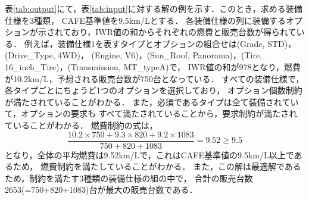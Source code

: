 

表\ref{tab:output}にて，表\ref{tab:input}に対する解の例を示す．このとき，求める装備仕様を3種類，
CAFE基準値を9.5km/Lとする．
各装備仕様の列に装備するオプションが示されており，IWR値の和からそれぞれの燃費と販売台数が得られている．
例えば，装備仕様1を表すタイプとオプションの組合せは(Grade, STD)，(Drive\_Type, 4WD)，
(Engine, V6)，(Sun\_Roof, Panorama)，(Tire, 16\_inch\_Tire)，(Transmission, MT\_typeA)で，
IWR値の和が978となり，燃費が10.2km/L，予想される販売台数が750台となっている．
すべての装備仕様で，各タイプごとにちょうど1つのオプションを選択しており，
オプション個数制約が満たされていることがわかる．
また，必須であるタイプは全て装備されていて，オプションの要求も
すべて満たされていることから，要求制約が満たされていることがわかる．
燃費制約の式は，
\begin{equation}
 	\frac{10.2\times750 + 9.3\times820 + 9.2\times1083}{750 + 820 +1083} = 9.52
	\geq 
	9.5
\end{equation}
となり，全体の平均燃費は9.52km/Lで，これはCAFE基準値の9.5km/L以上であるため，
燃費制約を満たしていることがわかる．
また，この解は最適解であるため，制約を満たす3種類の装備仕様の組の中で，
合計の販売台数2653(=750+820+1083)台が最大の販売台数である．
